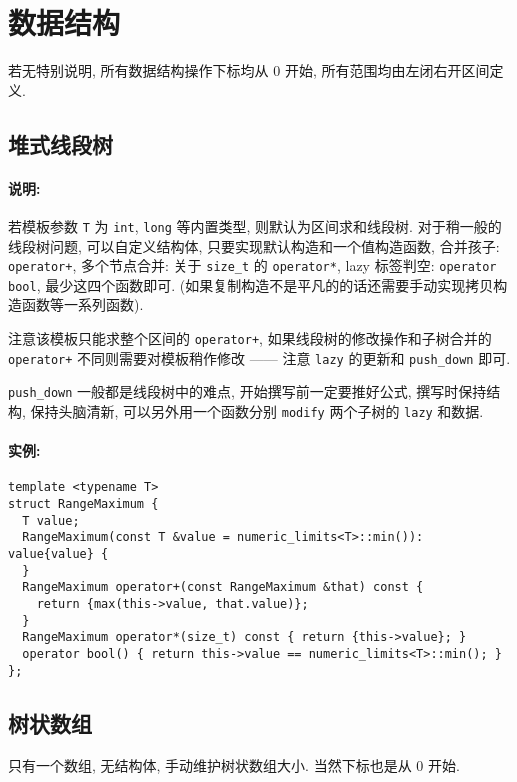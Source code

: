 \section{数据结构}

若无特别说明, 所有数据结构操作下标均从 0 开始, 所有范围均由左闭右开区间定义.

\subsection{堆式线段树}



\paragraph{说明:}
若模板参数 \lstinline{T} 为 \lstinline{int}, \lstinline{long} 等内置类型, 则默认为区间求和线段树. 对于稍一般的线段树问题, 可以自定义结构体, 只要实现默认构造和一个值构造函数, 合并孩子: \lstinline{operator+}, 多个节点合并: 关于 \lstinline{size_t} 的 \lstinline{operator*}, lazy 标签判空: \lstinline{operator bool}, 最少这四个函数即可. (如果复制构造不是平凡的的话还需要手动实现拷贝构造函数等一系列函数).

注意该模板只能求整个区间的 \lstinline{operator+}, 如果线段树的修改操作和子树合并的 \lstinline{operator+} 不同则需要对模板稍作修改 —— 注意 \lstinline{lazy} 的更新和 \lstinline{push_down} 即可.

\lstinline{push_down} 一般都是线段树中的难点, 开始撰写前一定要推好公式, 撰写时保持结构, 保持头脑清新, 可以另外用一个函数分别 \lstinline{modify} 两个子树的 \lstinline{lazy} 和数据.

\paragraph{实例:}
\begin{lstlisting}
template <typename T>
struct RangeMaximum {
  T value;
  RangeMaximum(const T &value = numeric_limits<T>::min()): value{value} {
  }
  RangeMaximum operator+(const RangeMaximum &that) const {
    return {max(this->value, that.value)};
  }
  RangeMaximum operator*(size_t) const { return {this->value}; }
  operator bool() { return this->value == numeric_limits<T>::min(); }
};
\end{lstlisting}

\subsection{树状数组}
只有一个数组, 无结构体, 手动维护树状数组大小. 当然下标也是从 0 开始.

